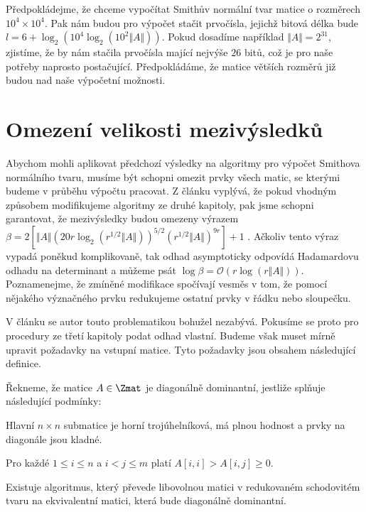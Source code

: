 Předpokládejme, že chceme vypočítat Smithův normální tvar matice o rozměrech
$ 10^4 \times 10^4 $. Pak nám budou pro výpočet stačit prvočísla, jejichž bitová
délka bude $ l = 6 + \log_2(10^4 \log_2(10^2 \Vert A \Vert)) $. Pokud dosadíme
například $ \Vert A \Vert = 2^{31} $, zjistíme, že by nám stačila prvočísla
mající nejvýše $ 26 $ bitů, což je pro naše potřeby naprosto
postačující. Předpokládáme, že matice větších rozměrů již budou nad naše výpočetní
možnosti.



\section{Omezení velikosti mezivýsledků}
Abychom mohli aplikovat předchozí výsledky na algoritmy pro výpočet Smithova
normálního tvaru, musíme být schopni omezit prvky všech matic, se kterými
budeme v průběhu výpočtu pracovat. Z článku \cite{triang} vyplývá, že pokud
vhodným způsobem modifikujeme algoritmy ze druhé kapitoly, pak jsme schopni
garantovat, že mezivýsledky budou omezeny výrazem
$ \beta = 2[\Vert A \Vert (20 r \log_2{ (r^{1/2} \Vert A \Vert) })^{5/2} (r^{1/2} \Vert A \Vert)^{9 r} ] + 1 $
\cite[Theorem 16]{triang}.
Ačkoliv tento výraz vypadá poněkud komplikovaně, tak odhad
asymptoticky odpovídá Hadamardovu odhadu na determinant a můžeme psát
$ \log{\beta} = \mathcal{O}(r \log{(r \Vert A \Vert)}) $.
Poznamenejme, že zmíněné modifikace spočívají vesměs v tom, že pomocí nějakého
význačného prvku redukujeme ostatní prvky v řádku nebo sloupečku.

V článku \cite{SNF_Arne} se autor touto problematikou bohužel nezabývá. Pokusíme
se proto pro procedury ze třetí kapitoly podat odhad vlastní. Budeme však muset
mírně upravit požadavky na vstupní matice. Tyto požadavky jsou obsahem následující
definice.

\begin{defi}
    Řekneme, že matice $ A \in \Zmat $ je diagonálně dominantní, jestliže
    splňuje následující podmínky:
    \begin{Cond}
        \item Hlavní $ n \times n $ submatice je horní trojúhelníková, má plnou
            hodnost a prvky na diagonále jsou kladné.
        \item Pro každé $ 1 \leq i \leq n $ a $ i < j \leq m $ platí $ A[i, i] > A[i, j] \geq 0 $.
    \end{Cond}
\end{defi}

\begin{lem}
Existuje algoritmus, který převede libovolnou matici v redukovaném schodovitém
tvaru na ekvivalentní matici, která bude diagonálně dominantní.
\end{lem}

